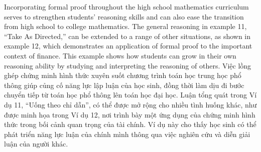 \documentclass[
  10pt,
  a4paper,
  landscape,
  twoside,
  openany
]{scrbook}
\newcommand{\EN}[1]{#1}
\newcommand{\VI}[1]{#1}
\newcommand{\NOTE}[1]{#1}
\newcounter{example}
\begin{document}
\TriPara
{
\EN{Incorporating formal proof throughout the high school mathematics curriculum serves to strengthen students' reasoning skills and can also ease the transition from high school to college mathematics. The general reasoning in example 11, ``Take As Directed,'' can be extended to a range of other situations, as shown in example 12, which demonstrates an application of formal proof to the important context of finance. This example shows how students can grow in their own reasoning ability by studying and interpreting the reasoning of others.}
}
{
\VI{Việc lồng ghép chứng minh hình thức xuyên suốt chương trình toán học trung học phổ thông giúp củng cố năng lực lập luận của học sinh, đồng thời làm dịu đi bước chuyển tiếp từ toán học phổ thông lên toán học đại học. Luận tổng quát trong Ví dụ 11, “Uống theo chỉ dẫn”, có thể được mở rộng cho nhiều tình huống khác, như được minh họa trong Ví dụ 12, nơi trình bày một ứng dụng của chứng minh hình thức trong bối cảnh quan trọng của tài chính. Ví dụ này cho thấy học sinh có thể phát triển năng lực luận của chính mình thông qua việc nghiên cứu và diễn giải luận của người khác.}
}
{
\NOTE{}
}
\end{document}
